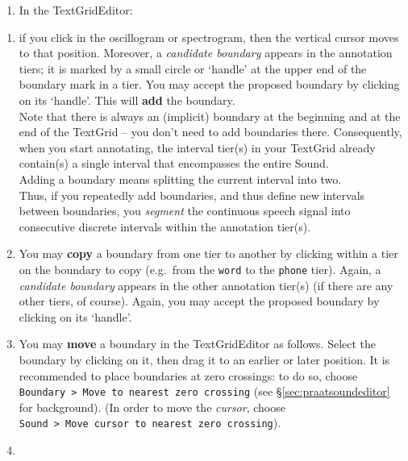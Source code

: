 \documentclass[
]{book}
\providecommand{\tightlist}{%
  \setlength{\itemsep}{0pt}\setlength{\parskip}{0pt}}
\begin{document}
\begin{enumerate}
\def\labelenumi{(\arabic{enumi})}
\setcounter{enumi}{4}
\tightlist
\item
  In the TextGridEditor:\\
\end{enumerate}

\begin{enumerate}
\def\labelenumi{(\alph{enumi})}
\item
  if you click in the oscillogram or spectrogram, then the vertical cursor moves to that position. Moreover, a \emph{candidate boundary} appears in the annotation tiers; it is marked by a small circle or `handle' at the upper end of the boundary mark in a tier. You may accept the proposed boundary by clicking on its `handle'. This will \textbf{add} the boundary.\\
  Note that there is always an (implicit) boundary at the beginning and at the end of the TextGrid -- you don't need to add boundaries there. Consequently, when you start annotating, the interval tier(s) in your TextGrid already contain(s) a single interval that encompasses the entire Sound.\\
  Adding a boundary means splitting the current interval into two.\\
  Thus, if you repeatedly add boundaries, and thus define new intervals between boundaries, you \emph{segment} the continuous speech signal into consecutive discrete intervals within the annotation tier(s).\\
\item
  You may \textbf{copy} a boundary from one tier to another by clicking within a tier on the boundary to copy (e.g.~from the \texttt{word} to the \texttt{phone} tier). Again, a \emph{candidate boundary} appears in the other annotation tier(s) (if there are any other tiers, of course). Again, you may accept the proposed boundary by clicking on its `handle'.\\
\item
  You may \textbf{move} a boundary in the TextGridEditor as follows. Select the boundary by clicking on it, then drag it to an earlier or later position. It is recommended to place boundaries at zero crossings: to do so, choose \texttt{Boundary\ \textgreater{}\ Move\ to\ nearest\ zero\ crossing} (see §\ref{sec:praatsoundeditor} for background). (In order to move the \emph{cursor}, choose \texttt{Sound\ \textgreater{}\ Move\ cursor\ to\ nearest\ zero\ crossing}).\\
\item

\end{enumerate}
\end{document}
